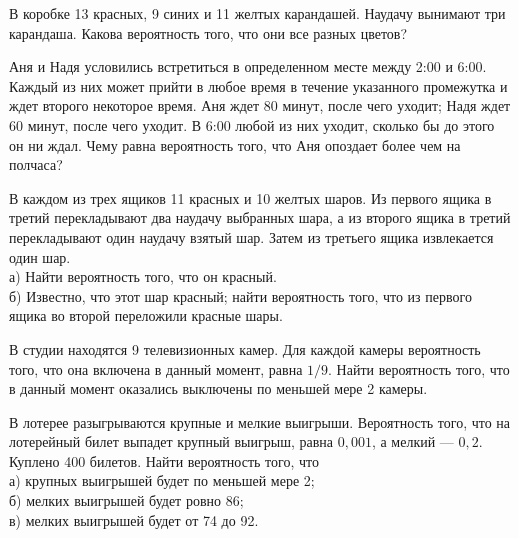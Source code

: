 \newpage\setcounter{zad}{0}



\begin{zkrW}{20}\noindent 
	В коробке 13 красных, 9 синих и 11 желтых карандашей. Наудачу вынимают три карандаша. Какова вероятность того, что они все разных цветов?
 
\end{zkrW}

\begin{zkrW}{20}\noindent 
	Аня и Надя условились встретиться в определенном месте между 2:00 и 6:00. Каждый из них может прийти в любое время в течение указанного промежутка и ждет второго некоторое время. Аня ждет 80 минут, после чего уходит; Надя ждет 60 минут, после чего уходит. В 6:00 любой из них уходит, сколько бы до этого он ни ждал. Чему равна вероятность того, что Аня опоздает более чем на полчаса?
 
\end{zkrW}

\begin{zkrW}{20}\noindent 
	В каждом из трех ящиков 11 красных и 10 желтых шаров. Из первого ящика в третий перекладывают два наудачу выбранных шара, а из второго ящика в третий перекладывают один наудачу взятый шар. Затем из третьего ящика извлекается один шар. \\ \indent а) Найти вероятность того, что он красный. \\ \indent б) Известно, что этот шар красный; найти вероятность того, что из первого ящика во второй переложили красные шары.
 
\end{zkrW}

\begin{zkrW}{20}\noindent 
	В студии находятся 9 телевизионных камер. Для каждой камеры вероятность того, что она включена в данный момент, равна $1/9$. Найти вероятность того, что в данный момент оказались выключены по меньшей мере 2 камеры.
 
\end{zkrW}

\begin{zkrW}{20}\noindent 
	В лотерее разыгрываются крупные и мелкие выигрыши. Вероятность того, что на лотерейный билет выпадет крупный выигрыш, равна $0{,}001$, а мелкий --- $0{,}2$. Куплено 400 билетов. Найти вероятность того, что \\ \indent а) крупных выигрышей будет по меньшей мере 2; \\ \indent б) мелких выигрышей будет ровно 86; \\ \indent в) мелких выигрышей будет от 74 до 92.
 
\end{zkrW}

